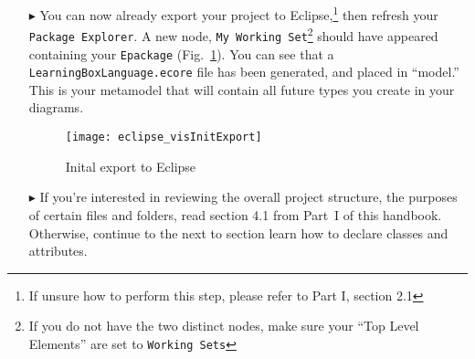 \begin{itemize}
\newpage

\item[$\blacktriangleright$] You can now already export your project to Eclipse,\footnote{If unsure how to perform this step, please
refer to Part I, section 2.1} then refresh your \texttt{Package Explorer}. A new node, \texttt{My Working Set}\footnote{If you do not have the two
distinct nodes, make sure your ``Top Level Elements'' are set to \texttt{Working Sets}} should have appeared containing your \texttt{Epackage}
(Fig.~\ref{fig:init_export}). You can see that a \texttt{LearningBoxLanguage.ecore} file has been generated, and placed in ``model.'' This is your metamodel
that will contain all future types you create in your diagrams.

\vspace{0.5cm}

\begin{figure}[htbp]
	\centering
  \texttt{[image: eclipse\_visInitExport]}
	\caption{Inital export to Eclipse}
	\label{fig:init_export}
\end{figure}
\FloatBarrier

\vspace{0.5cm}

\item[$\blacktriangleright$] If you're interested in reviewing the overall project structure, the purposes of certain files and folders, read section 4.1 from
Part~I of this handbook. Otherwise, continue to the next to section learn how to declare classes and attributes.

\end{itemize}

